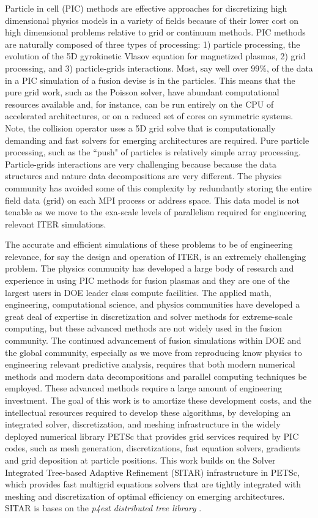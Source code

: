 \documentclass[review]{siamart}
\begin{document}
Particle in cell (PIC) methods are effective approaches for discretizing high dimensional physics models in a variety of fields because of their lower cost on high dimensional problems relative to grid or continuum methods.
PIC methods are naturally composed of three types of processing: 1) particle processing, the evolution of the 5D gyrokinetic Vlasov equation for magnetized plasmas, 2) grid processing, and 3) particle-grids interactions.
Most, say well over $99\%$, of the data in a PIC simulation of a fusion devise is in the particles.
This means that the pure grid work, such as the Poisson solver, have abundant computational resources available and, for instance, can be run entirely on the CPU of accelerated architectures, or on a reduced set of cores on symmetric systems.
Note, the collision operator uses a 5D grid solve that is computationally demanding and fast solvers for emerging architectures are required.
Pure particle processing, such as the ``push" of particles is relatively simple array processing.
Particle-grids interactions are very challenging because because the data structures and nature data decompositions are very different.
The physics community has avoided some of this complexity by redundantly storing the entire field data (grid) on each MPI process or address space.
This data model is not tenable as we move to the exa-scale levels of parallelism required for engineering relevant ITER simulations.

The accurate and efficient simulations of these problems to be of engineering relevance, for say the design and operation of ITER, is an extremely challenging problem.
The physics community has developed a large body of research and experience in using PIC methods for fusion plasmas and they are one of the largest users in DOE leader class compute facilities.
The applied math, engineering, computational science, and physics communities have developed a great deal of expertise in discretization and solver methods for extreme-scale computing, but these advanced methods are not widely used in the fusion community.
The continued advancement of fusion simulations within DOE and the global community, especially as we move from reproducing know physics to engineering relevant predictive analysis, requires that both modern numerical methods and modern data decompositions and parallel computing techniques be employed.
These advanced methods require a large amount of engineering investment.
The goal of this work is to amortize these development costs, and the intellectual resources required to develop these algorithms, by developing an integrated solver, discretization, and meshing infrastructure in the widely deployed numerical library PETSc that provides grid services required by PIC codes, such as mesh generation, discretizations, fast equation solvers, gradients and grid deposition at particle positions.
This work builds on the Solver Integrated Tree-based Adaptive Refinement (SITAR) infrastructure in PETSc, which provides fast multigrid equations solvers that are tightly integrated with meshing and discretization of optimal efficiency on emerging architectures.
SITAR is bases on the {\it p4est distributed tree library} \cite{Rudi:2015:EIS:2807591.2807675,DBLP:journals/siamsc/IsaacBWG15}.
\end{document}
